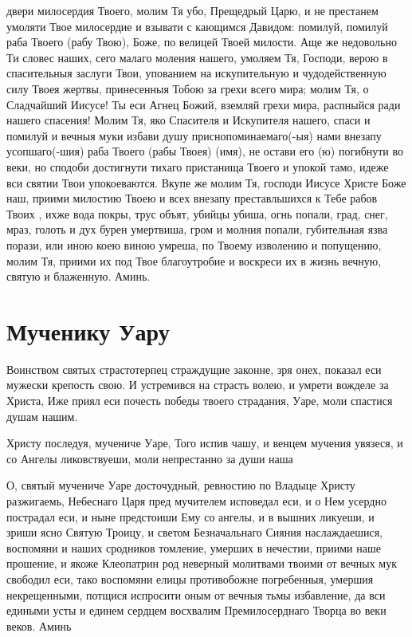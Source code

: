 \begin{mymulticols}
двери милосердия Твоего, молим Тя убо, Прещедрый Царю, и не престанем умоляти Твое милосердие и взывати с кающимся Давидом: помилуй, помилуй раба Твоего (рабу Твою), Боже, по велицей Твоей милости. Аще же недовольно Ти словес наших, сего малаго моления нашего, умоляем Тя, Господи, верою в спасительныя заслуги Твои, упованием на искупительную и чудодейственную силу Твоея жертвы, принесенныя Тобою за грехи всего мира; молим Тя, о Сладчайший Иисусе! Ты еси Агнец Божий, вземляй грехи мира, распныйся ради нашего спасения! Молим Тя, яко Спасителя и Искупителя нашего, спаси и помилуй и вечныя муки избави душу приснопоминаемаго(-ыя) нами внезапу усопшаго(-шия) раба Твоего (рабы Твоея) (имя), не остави его (ю) погибнути во веки, но сподоби достигнути тихаго пристанища Твоего и упокой тамо, идеже вси святии Твои упокоеваются. Вкупе же молим Тя, господи Иисусе Христе Боже наш, приими милостию Твоею и всех внезапу преставльшихся к Тебе рабов Твоих , ихже вода покры, трус объят, убийцы убиша, огнь попали, град, снег, мраз, голоть и дух бурен умертвиша, гром и молния попали, губительная язва порази, или иною коею виною умреша, по Твоему изволению и попущению, молим Тя, приими их под Твое благоутробие и воскреси их в жизнь вечную, святую и блаженную. Аминь.

\end{mymulticols}

\mychapterending



\section{Мученику Уару}\begin{mymulticols}


Воинством святых страстотерпец страждущие законне, зря онех, показал еси мужески крепость свою. И устремився на страсть волею, и умрети вожделе за Христа, Иже приял еси почесть победы твоего страдания, Уаре, моли спастися душам нашим.


Христу последуя, мучениче Уаре, Того испив чашу, и венцем мучения увязеся, и со Ангелы ликовствуеши, моли непрестанно за души наша


О, святый мучениче Уаре досточудный, ревностию по Владыце Христу разжигаемь, Небеснаго Царя пред мучителем исповедал еси, и о Нем усердно пострадал еси, и ныне предстоиши Ему со ангелы, и в вышних ликуеши, и зриши ясно Святую Троицу, и светом Безначальнаго Сияния наслаждаешися, воспомяни и наших сродников томление, умерших в нечестии, приими наше прошение, и якоже Клеопатрин род неверный молитвами твоими от вечных мук свободил еси, тако воспомяни елицы противобожне погребенныя, умершия некрещенными, потщися испросити оным от вечныя тьмы избавление, да вси едиными усты и единем сердцем восхвалим Премилосерднаго Творца во веки веков. Аминь

\end{mymulticols}

